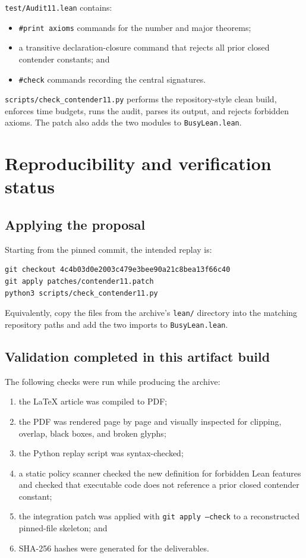 \documentclass[11pt]{article}
\theoremstyle{definition}
\theoremstyle{remark}
\newcommand{\code}[1]{\texttt{#1}}
\begin{document}
\code{test/Audit11.lean} contains:
\begin{itemize}[leftmargin=*]
\item \code{\#print axioms} commands for the number and major theorems;
\item a transitive declaration-closure command that rejects all prior closed
  contender constants; and
\item \code{\#check} commands recording the central signatures.
\end{itemize}

\code{scripts/check\_contender11.py} performs the repository-style clean build,
enforces time budgets, runs the audit, parses its output, and rejects forbidden
axioms. The patch also adds the two modules to \code{BusyLean.lean}.

\section{Reproducibility and verification status}

\subsection{Applying the proposal}

Starting from the pinned commit, the intended replay is:

\begin{lstlisting}[language={}]
git checkout 4c4b03d0e2003c479e3bee90a21c8bea13f66c40
git apply patches/contender11.patch
python3 scripts/check_contender11.py
\end{lstlisting}

Equivalently, copy the files from the archive's \code{lean/} directory into the
matching repository paths and add the two imports to \code{BusyLean.lean}.

\subsection{Validation completed in this artifact build}

The following checks were run while producing the archive:

\begin{enumerate}[leftmargin=*]
\item the LaTeX article was compiled to PDF;
\item the PDF was rendered page by page and visually inspected for clipping,
  overlap, black boxes, and broken glyphs;
\item the Python replay script was syntax-checked;
\item a static policy scanner checked the new definition for forbidden Lean
  features and checked that executable code does not reference a prior closed
  contender constant;
\item the integration patch was applied with \code{git apply --check} to a
  reconstructed pinned-file skeleton; and
\item SHA-256 hashes were generated for the deliverables.
\end{enumerate}
\end{document}
